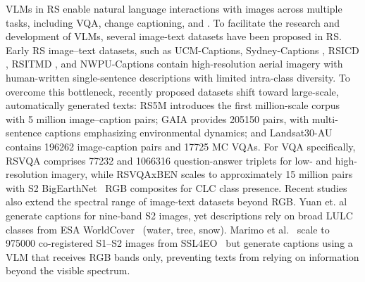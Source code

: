 \Acp{VLM} in \ac{RS} enable natural language interactions with images across multiple tasks, including \ac{VQA}, change captioning, and \genDet{} \cite{kuckreja2024geochat, irvin2025teochat, soni2025earthdial}. To facilitate the research and development of \acp{VLM}, several image-text datasets have been proposed in RS.
Early \ac{RS} image–text datasets, such as UCM-Captions, Sydney-Captions \cite{qu2016deep}, RSICD \cite{lu2017exploring}, RSITMD \cite{yuan2022exploring}, and NWPU-Captions \cite{cheng2022nwpu} contain high-resolution aerial imagery with human-written single-sentence descriptions with limited intra-class diversity. 
To overcome this bottleneck, recently proposed datasets shift toward large-scale, automatically generated texts: RS5M \cite{zhang2024rs5m} introduces the first million-scale corpus with 5 million image–caption pairs; GAIA \cite{gaia_zavras} provides \num{205150} pairs, with multi-sentence captions emphasizing environmental dynamics; and Landsat30-AU \cite{ma2025landsat30} contains \num{196262} image-caption pairs and \num{17725} \ac{MC} \acp{VQA}.
For \ac{VQA} specifically, RSVQA \cite{lobry2020rsvqa} comprises \num{77232} and \num{1066316} question-answer triplets for low- and high-resolution imagery, while RSVQAxBEN \cite{lobryRSVQAMeetsBigearthnet2021} scales to approximately \num{15} million pairs with \ac{S2} BigEarthNet~\cite{sumbul2019bigearthnet} \ac{RGB} composites for \ac{CLC} class presence.
Recent studies also extend the spectral range of image-text datasets beyond \ac{RGB}. 
Yuan et. al~\cite{ChatEarthNet} generate captions for nine-band \ac{S2} images, yet descriptions rely on broad \ac{LULC} classes from ESA WorldCover~\cite{zanaga2022esaworldcover} (\eg water, tree, snow). Marimo et al.~\cite{marimo2025beyond} scale to \num{975000} co-registered \ac{S1}–\ac{S2} images from SSL4EO~\cite{wang2023ssl4eo} but generate captions using a \ac{VLM} that receives \ac{RGB} bands only, preventing texts from relying on information beyond the visible spectrum. 